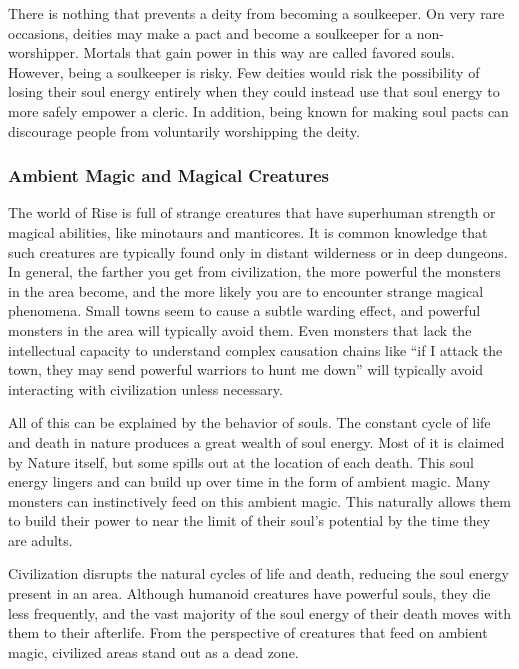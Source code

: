             There is nothing that prevents a deity from becoming a soulkeeper.
            On very rare occasions, deities may make a pact and become a soulkeeper for a non-worshipper.
            Mortals that gain power in this way are called favored souls.
            However, being a soulkeeper is risky.
            Few deities would risk the possibility of losing their soul energy entirely when they could instead use that soul energy to more safely empower a cleric.
            In addition, being known for making soul pacts can discourage people from voluntarily worshipping the deity.

        \subsubsection{Ambient Magic and Magical Creatures}
            The world of Rise is full of strange creatures that have superhuman strength or magical abilities, like minotaurs and manticores.
            It is common knowledge that such creatures are typically found only in distant wilderness or in deep dungeons.
            In general, the farther you get from civilization, the more powerful the monsters in the area become, and the more likely you are to encounter strange magical phenomena.
            Small towns seem to cause a subtle warding effect, and powerful monsters in the area will typically avoid them.
            Even monsters that lack the intellectual capacity to understand complex causation chains like ``if I attack the town, they may send powerful warriors to hunt me down'' will typically avoid interacting with civilization unless necessary.

            All of this can be explained by the behavior of souls.
            The constant cycle of life and death in nature produces a great wealth of soul energy.
            Most of it is claimed by Nature itself, but some spills out at the location of each death.
            This soul energy lingers and can build up over time in the form of ambient magic.
            Many monsters can instinctively feed on this ambient magic.
            This naturally allows them to build their power to near the limit of their soul's potential by the time they are adults.

            Civilization disrupts the natural cycles of life and death, reducing the soul energy present in an area.
            Although humanoid creatures have powerful souls, they die less frequently, and the vast majority of the soul energy of their death moves with them to their afterlife.
            From the perspective of creatures that feed on ambient magic, civilized areas stand out as a dead zone.

